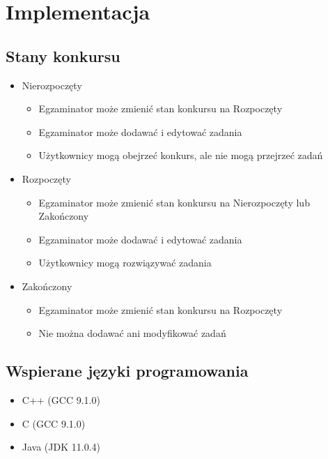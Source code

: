\documentclass{article}
\begin{document}
\section{Implementacja}
\subsection{Stany konkursu}
\begin{itemize}
    \item Nierozpoczęty
    \begin{itemize}
        \item Egzaminator może zmienić stan konkursu na Rozpoczęty
        \item Egzaminator może dodawać i edytować zadania
        \item Użytkownicy mogą obejrzeć konkurs, ale nie mogą przejrzeć zadań
    \end{itemize}

    \item Rozpoczęty
    \begin{itemize}
        \item Egzaminator może zmienić stan konkursu na Nierozpoczęty lub Zakończony
        \item Egzaminator może dodawać i edytować zadania
        \item Użytkownicy mogą rozwiązywać zadania
    \end{itemize}

    \item Zakończony
    \begin{itemize}
        \item Egzaminator może zmienić stan konkursu na Rozpoczęty
        \item Nie można dodawać ani modyfikować zadań
    \end{itemize}
\end{itemize}

\subsection{Wspierane języki programowania}
\begin{itemize}
    \item C++ (GCC 9.1.0)
    \item C (GCC 9.1.0)
    \item Java (JDK 11.0.4)
\end{itemize}
\end{document}

